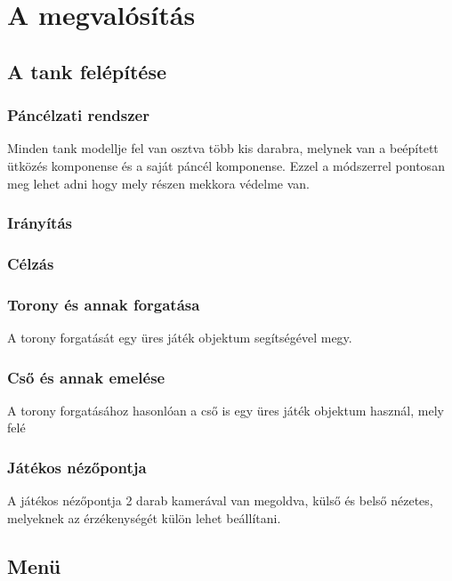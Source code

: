 \documentclass[
]{thesis-ekf}
\theoremstyle{definition}
\theoremstyle{remark}
\begin{document}
\section{A megvalósítás}

\subsection{A tank felépítése}

\subsubsection{Páncélzati rendszer}
Minden tank modellje fel van osztva több kis darabra, melynek van a beépített ütközés komponense és a saját páncél komponense. Ezzel a módszerrel pontosan meg lehet adni hogy mely részen mekkora védelme van.

\subsubsection{Irányítás}

\subsubsection{Célzás}

\subsubsection{Torony és annak forgatása}

A torony forgatását egy üres játék objektum segítségével megy.

\subsubsection{Cső és annak emelése}

A torony forgatásához hasonlóan a cső is egy üres játék objektum használ, mely felé

\subsubsection{Játékos nézőpontja}

A játékos nézőpontja 2 darab kamerával van megoldva, külső és belső nézetes, melyeknek az érzékenységét külön lehet beállítani.

\subsection{Menü}
\end{document}
